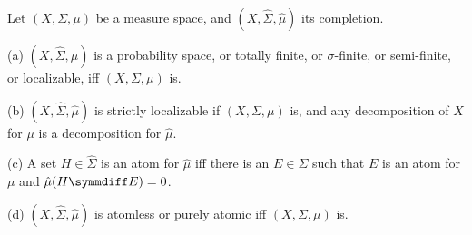  Let $(X,\Sigma,\mu)$ be a measure space, and
$(X,\hat\Sigma,\hat\mu)$ its completion.

(a) $(X,\hat\Sigma,\hat\mu)$ is a probability space, or totally finite,
or $\sigma$-finite, or semi-finite, or localizable,  iff
$(X,\Sigma,\mu)$ is.

(b) $(X,\hat\Sigma,\hat\mu)$ is strictly localizable if $(X,\Sigma,\mu)$
is, and any decomposition of $X$ for $\mu$ is a decomposition for
$\hat\mu$.

(c) A set $H\in\hat\Sigma$ is an atom for $\hat\mu$ iff there is an
$E\in\Sigma$ such that $E$ is an atom for $\mu$ and $\hat\mu(H\symmdiff
E)=0$.

(d) $(X,\hat\Sigma,\hat\mu)$ is atomless or purely atomic iff
$(X,\Sigma,\mu)$ is.

